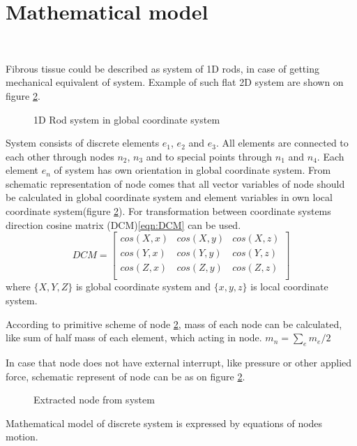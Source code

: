\section*{Mathematical model}
~\par
Fibrous tissue could be described as system of 1D rods, in case of getting mechanical 
equivalent of system.
Example of such flat 2D system are shown on figure \ref{fig:nodeExtract}.
\begin{figure}[H]\label{fig:rodSystem}
  \centering
  
  \caption{1D Rod system in global coordinate system}
\end{figure}
System consists of discrete elements $e_1$, $e_2$ and $e_3$. All elements are
connected to each other through nodes $n_2$, $n_3$ and to special points through
$n_1$ and $n_4$. Each element $e_n$ of system has own orientation in global
coordinate system. 
From schematic representation of node comes that all vector variables of node should be calculated
in global coordinate system and element variables in own local coordinate system(figure
\ref{fig:nodeExtract}). For transformation between coordinate systems direction cosine matrix
(DCM)\eqref{eqn:DCM} can be used.
\begin{equation}\label{eqn:DCM}
  DCM= \begin{bmatrix}
    cos(X,x) & cos(X,y) & cos(X,z) \\
    cos(Y,x) & cos(Y,y) & cos(Y,z) \\
    cos(Z,x) & cos(Z,y) & cos(Z,z) \\
  \end{bmatrix}
\end{equation}
where $\{X, Y, Z\}$ is global coordinate system and $\{x,y,z\}$ is local coordinate
system.\par According to primitive scheme of node \ref{fig:nodeExtract}, mass of
each node can be calculated, like sum of half mass of each element, which acting
in node. $m_n=\sum_{e}m_e/2$\par
In case that node does not have external interrupt, like pressure or other
applied force, schematic represent of node can be as on figure
\ref{fig:nodeExtract}.\par
\begin{figure}[H]
  \centering
  
  \caption{Extracted node from system}\label{fig:nodeExtract}
\end{figure}
Mathematical model of discrete system is expressed by equations of nodes motion.
